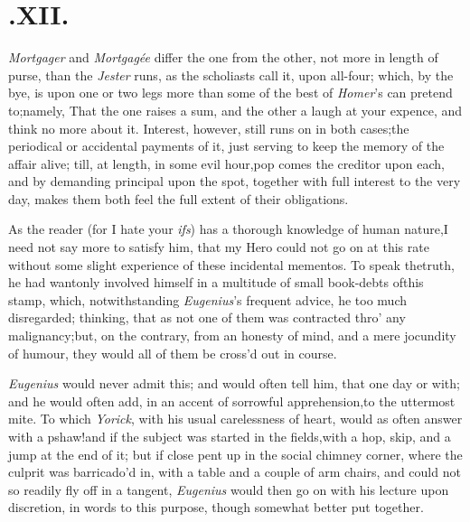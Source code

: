 \documentclass{article}
\begin{document}
\null
\section{.\enspace XII.}

 \textit{Mortgager} and \textit{Mortgagée}\break 
differ the one from the other, not more in length
of purse, than the \textit{Jester} 
runs, as the
scholiasts call it, upon all-four; which, by the bye, is upon one
or two legs more than some of the best of \textit{Homer}’s can
pretend to;\tsk  namely, That the one raises a sum, and the other
a laugh at your expence, and think no more about it. Interest,
however, still runs on in both cases;\tsk  the periodical or
accidental payments of it, just serving to keep the memory of the
affair alive; till, at length, in some evil hour,\tsk pop comes the
creditor upon each, and by demanding principal upon the spot,
together with full interest to the very day, makes them both feel
the full extent of their obligations.

As the reader (for I hate your \textit{ifs}) has a thorough
knowledge of human nature,\break I need not say more to satisfy him, that my
Hero could not go on at this rate without some
slight experience of these incidental mementos. To speak the\break truth,
he had wantonly involved himself in a multitude of small book-debts
of\break this stamp, which, notwithstanding \textit{Eu\-genius}’s
frequent advice, he too much disregarded; thinking, that as not one
of them was contracted thro’ any malignancy;\tsk  but, on
the contrary, from an honesty of mind, and a mere jocundity of
humour, they would all of them be cross’d out in course.

\textit{Eugenius} would never admit this; and would often tell
him, that one day or 
with; and he would often add, in an accent of sorrowful apprehension,\tsk  to the
uttermost mite. To which \textit{Yorick}, with his usual carelessness of heart,
would as often answer with a pshaw!\tsk  and if the subject was started in the
fields,\tsk  with a hop, skip, and a jump at the end of it; but if close pent up in
the social chimney corner, where the culprit was barri\-ca\-do’d in, with a table
and a couple of arm chairs, and could not so readily fly off in a tangent,\tsk
\textit{Eugenius} would then go on with his lecture upon
discretion, in words to
this purpose, though somewhat better put together.
\end{document}

